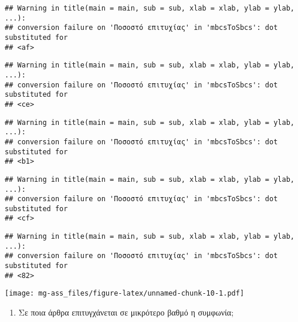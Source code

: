 \documentclass[
]{article}
\newenvironment{Shaded}{\begin{snugshade}}{\end{snugshade}}
\newcommand{\AttributeTok}[1]{\textcolor[rgb]{0.77,0.63,0.00}{#1}}
\newcommand{\ConstantTok}[1]{\textcolor[rgb]{0.00,0.00,0.00}{#1}}
\newcommand{\DecValTok}[1]{\textcolor[rgb]{0.00,0.00,0.81}{#1}}
\newcommand{\FunctionTok}[1]{\textcolor[rgb]{0.00,0.00,0.00}{#1}}
\newcommand{\NormalTok}[1]{#1}
\newcommand{\OtherTok}[1]{\textcolor[rgb]{0.56,0.35,0.01}{#1}}
\newcommand{\SpecialCharTok}[1]{\textcolor[rgb]{0.00,0.00,0.00}{#1}}
\newcommand{\StringTok}[1]{\textcolor[rgb]{0.31,0.60,0.02}{#1}}
\providecommand{\tightlist}{%
  \setlength{\itemsep}{0pt}\setlength{\parskip}{0pt}}
\begin{document}
\begin{verbatim}
## Warning in title(main = main, sub = sub, xlab = xlab, ylab = ylab, ...):
## conversion failure on 'Ποσοστό επιτυχίας' in 'mbcsToSbcs': dot substituted for
## <af>
\end{verbatim}

\begin{verbatim}
## Warning in title(main = main, sub = sub, xlab = xlab, ylab = ylab, ...):
## conversion failure on 'Ποσοστό επιτυχίας' in 'mbcsToSbcs': dot substituted for
## <ce>
\end{verbatim}

\begin{verbatim}
## Warning in title(main = main, sub = sub, xlab = xlab, ylab = ylab, ...):
## conversion failure on 'Ποσοστό επιτυχίας' in 'mbcsToSbcs': dot substituted for
## <b1>
\end{verbatim}

\begin{verbatim}
## Warning in title(main = main, sub = sub, xlab = xlab, ylab = ylab, ...):
## conversion failure on 'Ποσοστό επιτυχίας' in 'mbcsToSbcs': dot substituted for
## <cf>
\end{verbatim}

\begin{verbatim}
## Warning in title(main = main, sub = sub, xlab = xlab, ylab = ylab, ...):
## conversion failure on 'Ποσοστό επιτυχίας' in 'mbcsToSbcs': dot substituted for
## <82>
\end{verbatim}

\texttt{[image: mg-ass\_files/figure-latex/unnamed-chunk-10-1.pdf]}

\begin{enumerate}
\def\labelenumi{\arabic{enumi})}
\setcounter{enumi}{3}
\tightlist
\item
  Σε ποια άρθρα επιτυγχάνεται σε μικρότερο βαθμό η συμφωνία;
\end{enumerate}

\begin{Shaded}
\end{Shaded}
\end{document}
